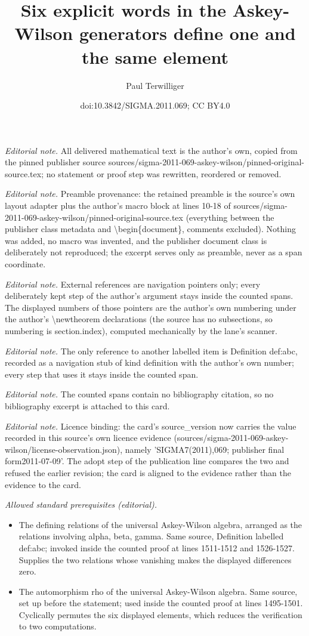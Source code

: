 \documentclass[10pt,a4paper]{amsart}
\title{Six explicit words in the Askey-Wilson generators define one and the same element}
\author{Paul Terwilliger}
\date{doi:10.3842/SIGMA.2011.069; CC BY4.0}
\begin{document}
\maketitle
\noindent\textit{Editorial note.} All delivered mathematical text is the author's own, copied from the pinned publisher source sources/sigma-2011-069-askey-wilson/pinned-original-source.tex; no statement or proof step was rewritten, reordered or removed.\par\medskip
\noindent\textit{Editorial note.} Preamble provenance: the retained preamble is the source's own layout adapter plus the author's macro block at lines 10-18 of sources/sigma-2011-069-askey-wilson/pinned-original-source.tex (everything between the publisher class metadata and \textbackslash{}begin\{document\}, comments excluded). Nothing was added, no macro was invented, and the publisher document class is deliberately not reproduced; the excerpt serves only as preamble, never as a span coordinate.\par\medskip
\noindent\textit{Editorial note.} External references are navigation pointers only; every deliberately kept step of the author's argument stays inside the counted spans. The displayed numbers of those pointers are the author's own numbering under the author's \textbackslash{}newtheorem declarations (the source has no subsections, so numbering is section.index), computed mechanically by the lane's scanner.\par\medskip
\noindent\textit{Editorial note.} The only reference to another labelled item is Definition def:abc, recorded as a navigation stub of kind definition with the author's own number; every step that uses it stays inside the counted span.\par\medskip
\noindent\textit{Editorial note.} The counted spans contain no bibliography citation, so no bibliography excerpt is attached to this card.\par\medskip
\noindent\textit{Editorial note.} Licence binding: the card's source\_version now carries the value recorded in this source's own licence evidence (sources/sigma-2011-069-askey-wilson/license-observation.json), namely 'SIGMA7(2011),069; publisher final form2011-07-09'. The adopt step of the publication line compares the two and refused the earlier revision; the card is aligned to the evidence rather than the evidence to the card.\par\medskip
\noindent\textit{Allowed standard prerequisites (editorial).}\begin{itemize}
\item The defining relations of the universal Askey-Wilson algebra, arranged as the relations involving alpha, beta, gamma. Same source, Definition labelled def:abc; invoked inside the counted proof at lines 1511-1512 and 1526-1527. Supplies the two relations whose vanishing makes the displayed differences zero.
\item The automorphism rho of the universal Askey-Wilson algebra. Same source, set up before the statement; used inside the counted proof at lines 1495-1501. Cyclically permutes the six displayed elements, which reduces the verification to two computations.
\end{itemize}\medskip
\end{document}
